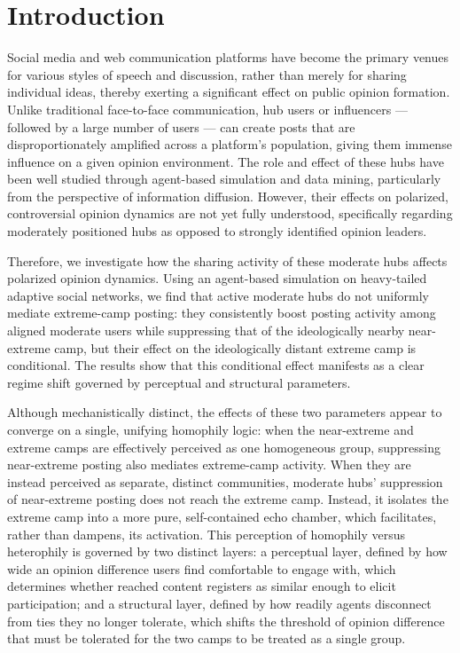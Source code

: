 \documentclass{svproc}
\def\Blue{\color[rgb]{0,0,1}}
\begin{document}
\Blue


\section{Introduction}\label{sec:intro}
Social media and web communication platforms have become the primary
venues for various styles of speech and discussion, rather than merely
for sharing individual ideas, thereby exerting a significant effect on
public opinion formation. Unlike traditional face-to-face
communication, hub users or influencers --- followed by a large number
of users --- can create posts that are disproportionately amplified
across a platform's population, giving them immense influence on a
given opinion environment. The role and effect of these hubs have been
well studied through agent-based simulation and data mining,
particularly from the perspective of information diffusion. However,
their effects on polarized, controversial opinion dynamics are not yet
fully understood, specifically regarding moderately positioned hubs as
opposed to strongly identified opinion leaders.
\par


Therefore, we investigate how the sharing activity of these moderate
hubs affects polarized opinion dynamics. Using an agent-based
simulation on heavy-tailed adaptive social networks, we find that
active moderate hubs do not uniformly mediate extreme-camp posting:
they consistently boost posting activity among aligned moderate users
while suppressing that of the ideologically nearby near-extreme camp,
but their effect on the ideologically distant extreme camp is
conditional. The results show that this conditional effect manifests
as a clear regime shift governed by perceptual and structural
parameters.
\par


Although mechanistically distinct, the effects of these two parameters
appear to converge on a single, unifying homophily logic: when the
near-extreme and extreme camps are effectively perceived as one
homogeneous group, suppressing near-extreme posting also mediates
extreme-camp activity. When they are instead perceived as separate,
distinct communities, moderate hubs' suppression of near-extreme
posting does not reach the extreme camp. Instead, it isolates the
extreme camp into a more pure, self-contained echo chamber, which
facilitates, rather than dampens, its activation. This perception of
homophily versus heterophily is governed by two distinct layers: a
perceptual layer, defined by how wide an opinion difference users find
comfortable to engage with, which determines whether reached content
registers as similar enough to elicit participation; and a structural
layer, defined by how readily agents disconnect from ties they no
longer tolerate, which shifts the threshold of opinion difference that
must be tolerated for the two camps to be treated as a single group.
\par
\end{document}
